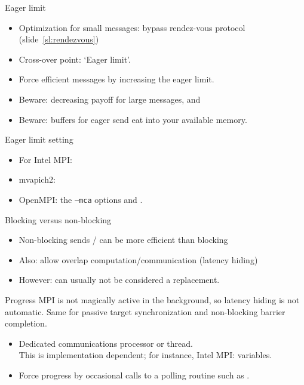 
\begin{frame}[containsverbatim]{Eager limit}
  \begin{itemize}
  \item Optimization for small messages: bypass rendez-vous protocol
    (slide~\ref{sl:rendezvous})
  \item Cross-over point: `Eager limit'.
  \item Force efficient messages by increasing the eager limit.
  \item Beware: decreasing payoff for large messages, and
  \item Beware: buffers for eager send eat into your available memory.
  \end{itemize}
\end{frame}

\begin{frame}[containsverbatim]{Eager limit setting}
    \begin{itemize}
    \item For Intel MPI: 
    \item mvapich2: 
    \item OpenMPI:  the
      \texttt{--mca} options  and
      .
    \end{itemize}
\end{frame}

\begin{frame}[containsverbatim]{Blocking versus non-blocking}
  \begin{itemize}
  \item Non-blocking sends / can be more
    efficient than blocking
  \item Also: allow overlap computation/communication (latency hiding)
  \item However: can usually not be considered a replacement.
  \end{itemize}
\end{frame}

\begin{frame}[containsverbatim]{Progress}
  MPI is not magically active in the background, so latency hiding is
  not automatic. Same for passive target synchronization and
  non-blocking barrier completion.
  \begin{itemize}
  \item Dedicated communications processor or thread.\\
    This is implementation dependent; for instance,
    Intel MPI:  variables.
  \item Force progress by occasional calls to a polling
    routine such as .
  \end{itemize}
\end{frame}

